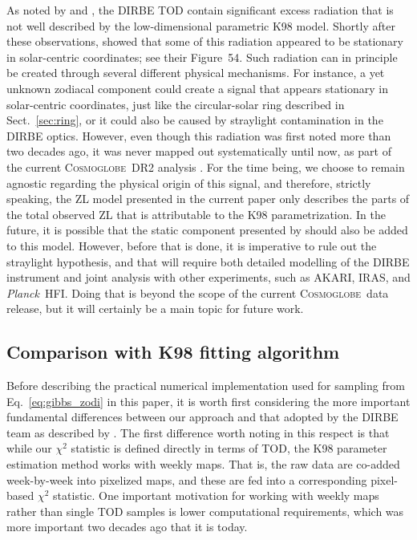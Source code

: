 \documentclass[twocolumn]{aa}
\def\Planck{\textit{Planck}}
\newcommand{\cosmoglobe}{\textsc{Cosmoglobe}}
\begin{document}
As noted by \citet{hauser1998} and \citet{Kelsall1998}, the DIRBE TOD
contain significant excess radiation that is not well described by the
low-dimensional parametric K98 model. Shortly after these
observations, \citet{leinert:1998} showed that some of this radiation
appeared to be stationary in solar-centric coordinates; see their
Figure~54. Such radiation can in principle be created through several
different physical mechanisms. For instance, a yet unknown zodiacal
component could create a signal that appears stationary in
solar-centric coordinates, just like the circular-solar ring described
in Sect.~\ref{sec:ring}, or it could also be caused by straylight
contamination in the DIRBE optics. However, even though this radiation
was first noted more than two decades ago, it was never mapped out
systematically until now, as part of the current \cosmoglobe\ DR2
analysis \citep{CG02_01}. For the time being, we choose to remain
agnostic regarding the physical origin of this signal, and therefore,
strictly speaking, the ZL model presented in the current paper only
describes the parts of the total observed ZL that is attributable to
the K98 parametrization. In the future, it is possible that the static
component presented by \citet{CG02_01} should also be added to this
model. However, before that is done, it is imperative to rule out the
straylight hypothesis, and that will require both detailed modelling
of the DIRBE instrument and joint analysis with other experiments,
such as AKARI, IRAS, and \Planck\ HFI. Doing that is beyond the scope
of the current \cosmoglobe\ data release, but it will certainly be a
main topic for future work.


\subsection{Comparison with K98 fitting algorithm}
\label{sec:algorithm_comparison}

Before describing the practical numerical implementation used for
sampling from Eq.~\eqref{eq:gibbs_zodi} in this paper, it is worth
first considering the more important fundamental differences between
our approach and that adopted by the DIRBE team as described by
\citet{Kelsall1998}. The first difference worth noting in this respect
is that while our $\chi^2$ statistic is defined directly in terms of
TOD, the K98 parameter estimation method works with weekly maps. That
is, the raw data are co-added week-by-week into pixelized maps, and
these are fed into a corresponding pixel-based $\chi^2$ statistic. One
important motivation for working with weekly maps rather than single
TOD samples is lower computational requirements, which was more
important two decades ago that it is today.
\end{document}
